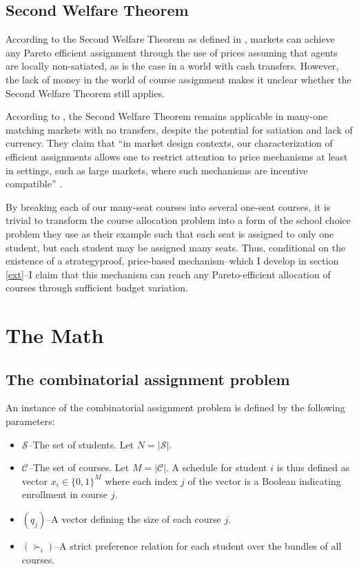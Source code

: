 \documentclass{article}
\begin{document}
\subsection{Second Welfare Theorem}
\label{swt}

According to the Second Welfare Theorem as defined in \textcite{arrow1951}, markets can achieve any Pareto efficient assignment through the use of prices assuming that agents are locally non-satiated, as is the case in a world with cash transfers. However, the lack of money in the world of course assignment makes it unclear whether the Second Welfare Theorem still applies.

According to \textcite{miralles2014}, the Second Welfare Theorem remains applicable in many-one matching markets with no transfers, despite the potential for satiation and lack of currency. They claim that ``in market design contexts, our characterization of efficient assignments allows one to restrict attention to price mechanisms at least in settings, such as large markets, where such mechanisms are incentive compatible'' \parencite[p. 2]{miralles2014}.

By breaking each of our many-seat courses into several one-seat courses, it is trivial to transform the course allocation problem into a form of the school choice problem they use as their example such that each seat is assigned to only one student, but each student may be assigned many seats. Thus, conditional on the existence of a strategyproof, price-based mechanism--which I develop in section \ref{ext}--I claim that this mechanism can reach any Pareto-efficient allocation of courses through sufficient budget variation.

\section{The Math}

\subsection{The combinatorial assignment problem}
\label{basicCA}
An instance of the combinatorial assignment problem is defined by the following parameters:
\begin{itemize}
    \item $\mathcal{S}$--The set of students. Let $N = |\mathcal{S}|$.
    \item $\mathcal{C}$--The set of courses. Let $M = |\mathcal{C}|$. A schedule for student $i$ is thus defined as vector $x_i \in \{0, 1\}^M$ where each index $j$ of the vector is a Boolean indicating enrollment in course $j$.  
    \item $(q_j)$--A vector defining the size of each course $j$.
    \item $(\succ_i)$--A strict preference relation for each student over the bundles of all courses. 
\end{itemize}
\end{document}
